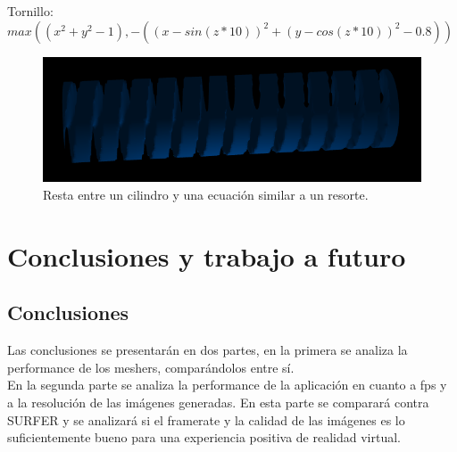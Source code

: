 \documentclass[12pt]{article}
\begin{document}
\clearpage
Tornillo: $max((x^2 + y^2 - 1) ,-((x-sin(z*10) )^2 + (y -cos (z*10))^2 -0.8))$ \\
\begin{figure}[h!]
\includegraphics[width=0.7\linewidth,center]{g5.png}
\caption{Resta entre un cilindro y una ecuación similar a un resorte.}
\end{figure}

\clearpage
\section{Conclusiones y trabajo a futuro}
\subsection{Conclusiones}
Las conclusiones se presentarán en dos partes, en la primera se analiza la performance de los meshers, comparándolos entre sí. 
\\En la segunda parte se analiza la performance de la aplicación en cuanto a fps y a la resolución de las imágenes generadas. En esta parte se comparará contra SURFER y se analizará si el framerate y la calidad de las imágenes es lo suficientemente bueno para una experiencia positiva de realidad virtual.
\end{document}
